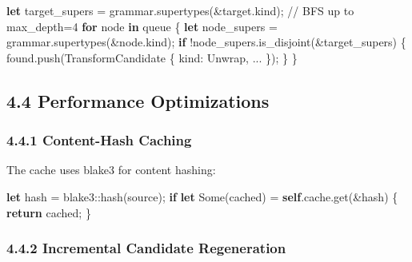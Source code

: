 \documentclass[
  letterpaper,
]{article}
\newenvironment{Shaded}{\begin{snugshade}}{\end{snugshade}}
\newcommand{\CommentTok}[1]{\textcolor[rgb]{0.37,0.37,0.37}{#1}}
\newcommand{\ConstantTok}[1]{\textcolor[rgb]{0.56,0.35,0.01}{#1}}
\newcommand{\ControlFlowTok}[1]{\textcolor[rgb]{0.00,0.23,0.31}{\textbf{#1}}}
\newcommand{\KeywordTok}[1]{\textcolor[rgb]{0.00,0.23,0.31}{\textbf{#1}}}
\newcommand{\NormalTok}[1]{\textcolor[rgb]{0.00,0.23,0.31}{#1}}
\newcommand{\OperatorTok}[1]{\textcolor[rgb]{0.37,0.37,0.37}{#1}}
\newcommand{\PreprocessorTok}[1]{\textcolor[rgb]{0.68,0.00,0.00}{#1}}
\begin{document}
\begin{Shaded}
\begin{Highlighting}[]
\KeywordTok{let}\NormalTok{ target\_supers }\OperatorTok{=}\NormalTok{ grammar}\OperatorTok{.}\NormalTok{supertypes(}\OperatorTok{\&}\NormalTok{target}\OperatorTok{.}\NormalTok{kind)}\OperatorTok{;}
\CommentTok{// BFS up to max\_depth=4}
\ControlFlowTok{for}\NormalTok{ node }\KeywordTok{in}\NormalTok{ queue }\OperatorTok{\{}
    \KeywordTok{let}\NormalTok{ node\_supers }\OperatorTok{=}\NormalTok{ grammar}\OperatorTok{.}\NormalTok{supertypes(}\OperatorTok{\&}\NormalTok{node}\OperatorTok{.}\NormalTok{kind)}\OperatorTok{;}
    \ControlFlowTok{if} \OperatorTok{!}\NormalTok{node\_supers}\OperatorTok{.}\NormalTok{is\_disjoint(}\OperatorTok{\&}\NormalTok{target\_supers) }\OperatorTok{\{}
\NormalTok{        found}\OperatorTok{.}\NormalTok{push(TransformCandidate }\OperatorTok{\{}\NormalTok{ kind}\OperatorTok{:}\NormalTok{ Unwrap}\OperatorTok{,} \OperatorTok{...} \OperatorTok{\}}\NormalTok{)}\OperatorTok{;}
    \OperatorTok{\}}
\OperatorTok{\}}
\end{Highlighting}
\end{Shaded}

\subsection{4.4 Performance
Optimizations}\label{performance-optimizations}

\subsubsection{4.4.1 Content-Hash Caching}\label{content-hash-caching}

The cache uses blake3 for content hashing:

\begin{Shaded}
\begin{Highlighting}[]
\KeywordTok{let}\NormalTok{ hash }\OperatorTok{=} \PreprocessorTok{blake3::}\NormalTok{hash(source)}\OperatorTok{;}
\ControlFlowTok{if} \KeywordTok{let} \ConstantTok{Some}\NormalTok{(cached) }\OperatorTok{=} \KeywordTok{self}\OperatorTok{.}\NormalTok{cache}\OperatorTok{.}\NormalTok{get(}\OperatorTok{\&}\NormalTok{hash) }\OperatorTok{\{}
    \ControlFlowTok{return}\NormalTok{ cached}\OperatorTok{;}
\OperatorTok{\}}
\end{Highlighting}
\end{Shaded}

\subsubsection{4.4.2 Incremental Candidate
Regeneration}\label{incremental-candidate-regeneration}
\end{document}
